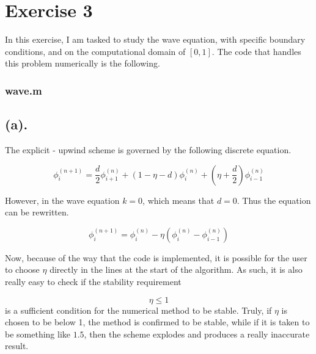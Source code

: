 
\section{Exercise 3}
In this exercise, I am tasked to study the wave equation, with specific boundary conditions, and on the computational domain of \( [0, 1] \). The code that handles this problem numerically is the following.

\subsubsection*{wave.m}


\subsection{(a).}
The explicit - upwind scheme is governed by the following discrete equation.

\[ \phi_{i}^{(n+1)} = \frac{d}{2} \phi_{i+1}^{(n)} + (1 - \eta - d) \phi_{i}^{(n)} + \left( \eta + \frac{d}{2} \right) \phi_{i-1}^{(n)} 
\]

However, in the wave equation \( k = 0 \), which means that \( d = 0 \). Thus the equation can be rewritten.

\[
	\phi_{i}^{(n+1)} = \phi_{i}^{(n)} - \eta \left( \phi_{i}^{(n)} - \phi_{i-1}^{(n)} \right)
\]

Now, because of the way that the code is implemented, it is possible for the user to choose \( \eta \) directly in the lines at the start of the algorithm. As such, it is also really easy to check if the stability requirement

\[
	\eta \leq 1
\]
is a sufficient condition for the numerical method to be stable. Truly, if \( \eta \) is chosen to be below 1, the method is confirmed to be stable, while if it is taken to be something like \( 1.5 \), then the scheme explodes and produces a really inaccurate result.



